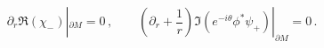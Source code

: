 \begin{equation}
\partial_r \Re (\chi_-)|_{\partial M}=0\,,\qquad
\left( \partial_r +\frac 1r \right) 
\Im \left( e^{-i\theta} \phi^* \psi_+ \right)|_{\partial M}=0\,.
\label{bcUUN}
\end{equation}

